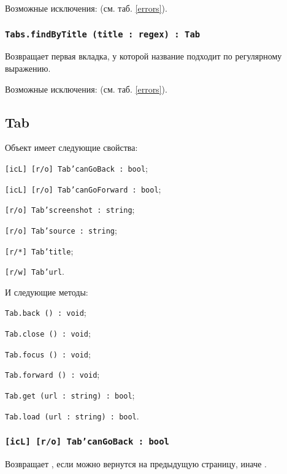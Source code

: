Возможные исключения:  (см. таб. \ref{errors}).

\subsubsection{\texttt{Tabs.findByTitle (title : regex) : Tab}}

Возвращает первая вкладка, у которой название подходит по регулярному выражению.

Возможные исключения:  (см. таб. \ref{errors}).

\subsection{{\color{orange} Tab}}

Объект \tab{} имеет следующие свойства:
\begin{icItems}
	\item \texttt{[icL] [r/o] Tab'canGoBack : bool};
	\item \texttt{[icL] [r/o] Tab'canGoForward : bool};
	\item \texttt{[r/o] Tab'screenshot : string};
	\item \texttt{[r/o] Tab'source : string};
	\item \texttt{[r/*] Tab'title};
	\item \texttt{[r/w] Tab'url}.
\end{icItems}

И следующие методы:
\begin{icItems}
	\item \texttt{Tab.back () : void};
	\item \texttt{Tab.close () : void};
	\item \texttt{Tab.focus () : void};
	\item \texttt{Tab.forward () : void};
	\item \texttt{Tab.get (url : string) : bool};
	\item \texttt{Tab.load (url : string) : bool}.
\end{icItems}

\subsubsection{\texttt{[icL] [r/o] Tab'canGoBack : bool}}

Возвращает \true, если можно вернутся на предыдущую страницу, иначе \false.

